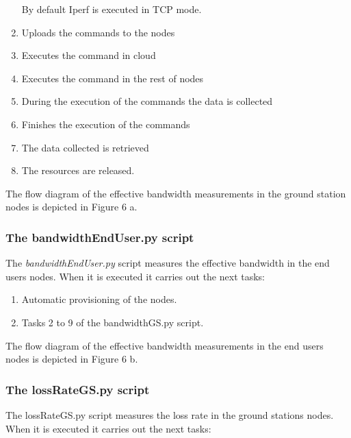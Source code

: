 \begin{enumerate}
By default Iperf is executed in TCP mode.

\item Uploads the commands to the nodes
\item Executes the command in cloud
\item Executes the command in the rest of nodes
\item During the execution of the commands the data is collected
\item Finishes the execution of the commands 
\item The data collected is retrieved 
\item The resources are released.
\end{enumerate}

The flow diagram of the effective bandwidth measurements in the ground station nodes is depicted in Figure 6 a.

\subsubsection{The bandwidthEndUser.py script}

The \emph{bandwidthEndUser.py} script measures the effective bandwidth in the
end users nodes. When it is executed it carries out the next tasks:
\begin{enumerate}
\item Automatic provisioning of the nodes.
\item Tasks 2 to 9 of the bandwidthGS.py script.
\end{enumerate}

The flow diagram of the effective bandwidth measurements in the end users nodes is depicted in Figure 6 b.

\subsubsection{The lossRateGS.py script}

The lossRateGS.py  script measures the loss rate in the ground stations
nodes. When it is executed it carries out the next tasks:

